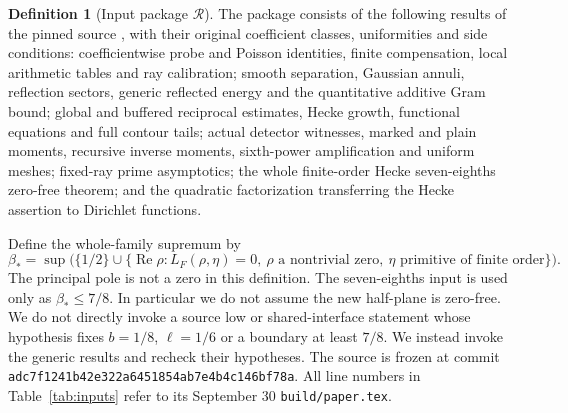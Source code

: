\documentclass[11pt,a4paper]{article}
\theoremstyle{definition}
\newtheorem{definition}[theorem]{Definition}
\newcommand{\Rea}{\operatorname{Re}}
\newcommand{\bet}{\beta_*}
\newcommand{\src}[1]{\nolinkurl{#1}}
\begin{document}
\begin{definition}[Input package $\mathcal R$]\label{def:R}
The package consists of the following results of the pinned source
\cite{OAI}, with their original coefficient classes, uniformities and
side conditions:
coefficientwise probe and Poisson identities, finite compensation,
local arithmetic tables and ray calibration; smooth separation,
Gaussian annuli, reflection sectors, generic reflected energy and the
quantitative additive Gram bound; global and buffered reciprocal
estimates, Hecke growth, functional equations and full contour tails;
actual detector witnesses, marked and plain moments, recursive
inverse moments, sixth-power amplification and uniform meshes;
fixed-ray prime asymptotics; the whole finite-order Hecke
seven-eighths zero-free theorem; and the quadratic factorization
transferring the Hecke assertion to Dirichlet functions.
\end{definition}

Define the whole-family supremum by
\[
 \bet=\sup\bigl(\{1/2\}\cup
 \{\Rea\rho:L_F(\rho,\eta)=0,\ \rho\text{ a nontrivial zero},
               \ \eta\text{ primitive of finite order}\}\bigr).
\]
The principal pole is not a zero in this definition.
The seven-eighths input is used only as $\bet\le7/8$.
In particular we do not assume the new half-plane is zero-free.
We do not directly invoke a source low or shared-interface statement
whose hypothesis fixes $b=1/8$, $\ell=1/6$ or a boundary at least $7/8$.
We instead invoke the generic results and recheck their hypotheses.
The source is frozen at commit
\src{adc7f1241b42e322a6451854ab7e4b4c146bf78a}.
All line numbers in Table~\ref{tab:inputs} refer to its September 30
\src{build/paper.tex}.
\end{document}
